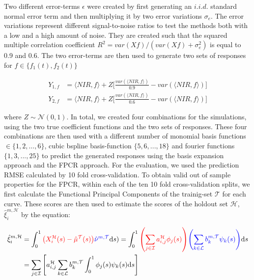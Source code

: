 \documentclass[11pt,twoside,a4paper]{article}
\begin{document}
		 Two different error-terms $\epsilon$ were created by first generating an $i.i.d.$ standard normal error term and then multiplying it by two error variations $\sigma_e $. The error variations represent different signal-to-noise ratios to test the methods both with a low and a high amount of noise. They are created such that the squared multiple correlation coefficient $R^2 = var(Xf) / (var(Xf) + \sigma^2_{e})$ is equal to 0.9 and 0.6. The two error-terms are then used to generate two sets of responses for $f \in \{f_1(t), f_2(t)\}$
		
		\begin{equation}
			\begin{split}
				Y_{1,f} & = \langle NIR, f\rangle + Z  \biggl\lbrack\frac{var(\langle NIR, f\rangle)}{0.9} - var(\langle NIR, f\rangle)\biggr\rbrack \\
				Y_{2,f} & = \langle NIR, f\rangle + Z  \biggl\lbrack\frac{var(\langle NIR, f\rangle)}{0.6} - var(\langle NIR, f\rangle)\biggr\rbrack
			\end{split}
		\end{equation}
		
		where $Z \sim \mathcal{N}(0,1)$. In total, we created four combinations for the simulations, using the two true coefficient functions and the two sets of responses. These four combinations are then used with a different number of monomial basis functions $ \in \{1,2, \dots, 6\}$, cubic bspline basis-function $\{5,6,...,18\}$ and fourier functions $\{1,3,...,25\}$ to predict the generated responses using the basis expansion approach and the FPCR approach. For the evaluation, we used the prediction RMSE calculated by 10 fold cross-validation.
		 To obtain valid out of sample properties for the FPCR, within each of the ten 10 fold cross-validation splits, we first calculate the Functional Principal Components of the trainig-set $\mathcal{T}$ for each curve. These scores are then used to estimate the scores of the holdout set $\mathcal{H}$, $\hat{\xi}_{i}^{m, \mathcal{H}}$  by the equation:
		 
	\begin{equation}
		\begin{split}
			\hat{\xi}_{i}^{m, \mathcal{H}} &=  \int_{0}^{1} {\color{red} \left(X_{i}^{\mathcal{H}}(s) - \hat{\mu}^{\mathcal{T}}(s)\right)} {\color{blue}\hat{\nu}^{m, \mathcal{T}} }\mathrm{d}s) 
						    = \int_{0}^{1} {\color{red}\left(\sum_{j \in \mathcal{I}} a_{i,j}^{\mathcal{H}} \phi_j(s)\right)} {\color{blue}\left(\sum_{k \in \mathcal{L}} b_{k}^{m, \mathcal{T}} \psi_{k}(s)\right)} \mathrm{d}s \\
			 &= \sum_{j \in \mathcal{I}} \left[ a_{i,j}^{\mathcal{H}}\sum_{k \in \mathcal{L}}  b_{k}^{m, \mathcal{T}} \int_{0}^{1} \phi_j(s) \psi_{k}(s)\mathrm{d}s\right]
		\end{split}
	\end{equation}
	\vspace{	0.2cm}
	
\end{document}
